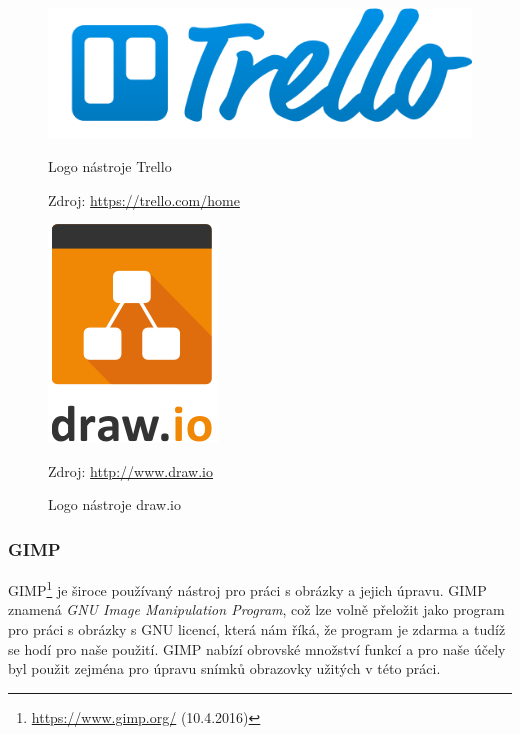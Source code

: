 \documentclass[czech,master,public,dept460,male,java,cpdeclaration]{diploma}
\begin{document}
\begin{figure}[H]
\begin{minipage}{.5\textwidth}
\centering
                \includegraphics[scale=0.3]{img/trello-logo-blue.png}
        \caption{Logo nástroje Trello}
                \label{fig:trellologo}
                \centering Zdroj: \url{https://trello.com/home}
\end{minipage}
\begin{minipage}{.5\textwidth}
\centering
                \includegraphics[scale=0.2]{img/drawiologo.png}
        \caption{Logo nástroje draw.io}
        \label{fig:iologo}
        \centering Zdroj: \url{http://www.draw.io}
    \end{minipage}
\end{figure}



\subsubsection{GIMP}
GIMP\footnote{\url{https://www.gimp.org/} (10.4.2016)} je široce používaný nástroj pro práci s obrázky a jejich úpravu. GIMP znamená
 \textit{GNU Image Manipulation Program}, což lze volně přeložit jako program pro práci s obrázky s GNU
 licencí, která nám říká, že program je zdarma a tudíž se hodí pro naše použití. GIMP nabízí obrovské
 množství funkcí a pro naše účely byl použit zejména pro úpravu snímků obrazovky užitých v této práci.
\end{document}
